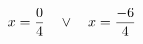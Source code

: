 \documentclass[preview]{standalone}
\begin{document}
\begin{align*}
\special{dvisvgm:raw <g id='unique000'>}x=\frac{0}{4} \quad \lor \quad x=\frac{-6}{4}\special{dvisvgm:raw </g>}
\end{align*}
\end{document}
